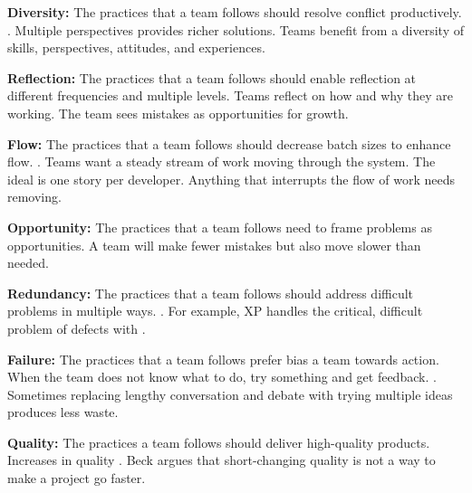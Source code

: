 \textbf{Diversity:} The practices that a team follows should resolve conflict productively.   \cite{BeckExtremeProgramming2004}. Multiple perspectives provides richer solutions. Teams benefit from a diversity of skills, perspectives, attitudes, and experiences.


\textbf{Reflection:} The practices that a team follows should enable reflection at different frequencies and multiple levels. Teams reflect on how and why they are working. The team sees mistakes as opportunities for growth.


\textbf{Flow:} The practices that a team follows should decrease batch sizes to enhance flow.   \cite{BeckExtremeProgramming2004}. Teams want a steady stream of work moving through the system. The ideal  is one story per developer. Anything that interrupts the flow of work needs removing. 


\textbf{Opportunity:} The practices that a team follows need to frame problems as opportunities. A team  will make fewer mistakes but also move slower than needed.


\textbf{Redundancy:} The practices that a team follows should address difficult problems in multiple ways.  \cite{BeckExtremeProgramming2004}. For example, XP handles the critical, difficult problem of defects with   \cite{BeckExtremeProgramming2004}. 




\textbf{Failure:} The practices that a team follows prefer bias a team towards action. When the team does not know what to do, try something and get feedback.  \cite{BeckExtremeProgramming2004}. Sometimes replacing lengthy conversation and debate with trying multiple ideas produces less waste.


\textbf{Quality:} The practices a team follows should deliver high-quality products. Increases in quality  \cite{BeckExtremeProgramming2004}. Beck argues that short-changing quality is not a way to make a project go faster. 


